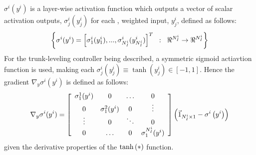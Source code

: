 			$\sigma^{i}(y^{i})$ is a layer-wise activation function which outputs a vector of scalar activation outputs, $\sigma_{j}^{i}(y_{j}^{i}) $ for each \Jth, weighted input, $y_{j}^{i}$, defined as follows:
			\begin{equation*}
				\left\{ \sigma^{i}(y^{i}) = \left[ \sigma_{1}^{i}(y_{1}^{i}),...,\sigma_{N_{I}^{i}}^{i}(y_{N_{I}^{i}}^{i}) \right]^{T} \hspace{2mm} : \hspace{2mm} \Re^{N_{I}^{i}} \rightarrow \Re^{N_{I}^{i}}\right\}
			\end{equation*}
For the trunk-leveling controller being described, a symmetric sigmoid actiavtion function is used, making each $\sigma_{j}^{i}(y_{j}^{i}) \equiv \tanh(y_{j}^{i}) \in [-1,1]$. Hence the gradient $\nabla_{y} \sigma^{i}(y^{i})$ is defined as follows: 
			\newcommand{\acti}[1]{\sigma^{#1}_{1}(y^{i})}
			\begin{equation}
				\nabla_{y} \sigma^{i}(y^{i})  =
				\left[
				\begin{array}{cccc}
					\acti{1}	&	0		&	\ldots 		&	0 			\\	
					0			&	\acti{2}&	0			& 	\vdots 		\\
					\vdots 		&	0		& 	\ddots 		& 	0			\\
 					0			&	\ldots	&	0			& 	\acti{N_{I}^{i}}
				\end{array}
				\right]
				\wrap{\vec{1}_{N_{I}^{i}\times1} - \sigma^{i}\wrap{y^{i} } }
				\label{eq::bp_sigmoid_deriv}
			\end{equation} 
			given the derivative properties of the $\tanh\left(*\right)$ function.
			
